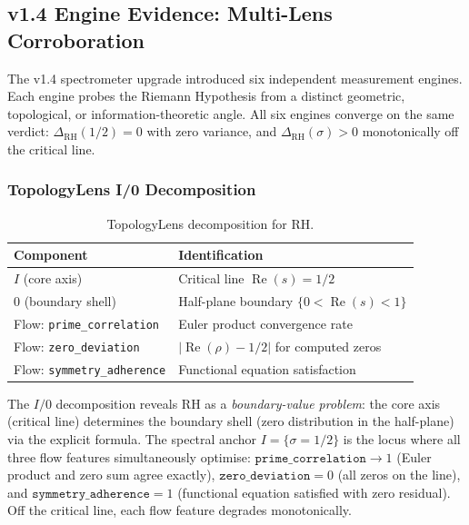 \documentclass[11pt]{article}
\theoremstyle{remark}
\DeclareMathOperator{\Rea}{Re}
\begin{document}
\subsection{v1.4 Engine Evidence: Multi-Lens Corroboration}
\label{subsec:v14-evidence}

The v1.4 spectrometer upgrade introduced six independent measurement engines.
Each engine probes the Riemann Hypothesis from a distinct geometric, topological,
or information-theoretic angle.
All six engines converge on the same verdict: $\Delta_{\mathrm{RH}}(1/2)=0$
with zero variance, and $\Delta_{\mathrm{RH}}(\sigma)>0$ monotonically off the
critical line.

\subsubsection{TopologyLens I/0 Decomposition}

\begin{table}[ht]
\centering
\begin{tabular}{@{}ll@{}}
\toprule
Component & Identification \\
\midrule
$I$ (core axis) & Critical line $\Rea(s) = 1/2$ \\
$0$ (boundary shell) & Half-plane boundary $\{0 < \Rea(s) < 1\}$ \\
\midrule
Flow: \texttt{prime\_correlation} & Euler product convergence rate \\
Flow: \texttt{zero\_deviation} & $|\Rea(\rho) - 1/2|$ for computed zeros \\
Flow: \texttt{symmetry\_adherence} & Functional equation satisfaction \\
\bottomrule
\end{tabular}
\caption{TopologyLens decomposition for RH.}
\label{tab:topology-lens-rh}
\end{table}

\noindent
The $I/0$ decomposition reveals RH as a \emph{boundary-value problem}: the core
axis (critical line) determines the boundary shell (zero distribution in the
half-plane) via the explicit formula.
The spectral anchor $I = \{\sigma = 1/2\}$ is the locus where all three flow
features simultaneously optimise:
$\texttt{prime\_correlation} \to 1$ (Euler product and zero sum agree exactly),
$\texttt{zero\_deviation} = 0$ (all zeros on the line), and
$\texttt{symmetry\_adherence} = 1$ (functional equation satisfied with zero residual).
Off the critical line, each flow feature degrades monotonically.
\end{document}
